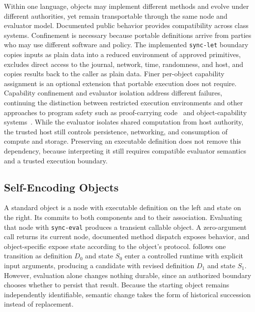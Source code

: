 Within one language, objects may implement different methods and evolve under different authorities, yet remain transportable through the same node and evaluator model. Documented public behavior provides compatibility across class systems. Confinement is necessary because portable definitions arrive from parties who may use different software and policy. The implemented \texttt{sync-let} boundary copies inputs as plain data into a reduced environment of approved primitives, excludes direct access to the journal, network, time, randomness, and host, and copies results back to the caller as plain data. Finer per-object capability assignment is an optional extension that portable execution does not require. Capability confinement and evaluator isolation address different failures, continuing the distinction between restricted execution environments and other approaches to program safety such as proof-carrying code~\cite{Levy1995safe,Necula1997proof} and object-capability systems~\cite{LemmerWebber2025spritely}. While the evaluator isolates shared computation from host authority, the trusted host still controls persistence, networking, and consumption of compute and storage. Preserving an executable definition does not remove this dependency, because interpreting it still requires compatible evaluator semantics and a trusted execution boundary.

\subsection{Self-Encoding Objects}
\label{sec:objects}

A standard object is a node with executable definition on the left and state on the right. Its  commits to both components and to their association. Evaluating that node with \texttt{sync-eval} produces a transient callable object. A zero-argument call returns its current node, documented method dispatch exposes behavior, and object-specific  expose state according to the object's protocol.  follows one transition as definition $D_0$ and state $S_0$ enter a controlled runtime with explicit input arguments, producing a candidate with revised definition $D_1$ and  state $S_1$. However, evaluation alone changes nothing durable, since an authorized boundary chooses whether to persist that result. Because the starting object remains independently identifiable, semantic change takes the form of historical succession instead of replacement.

